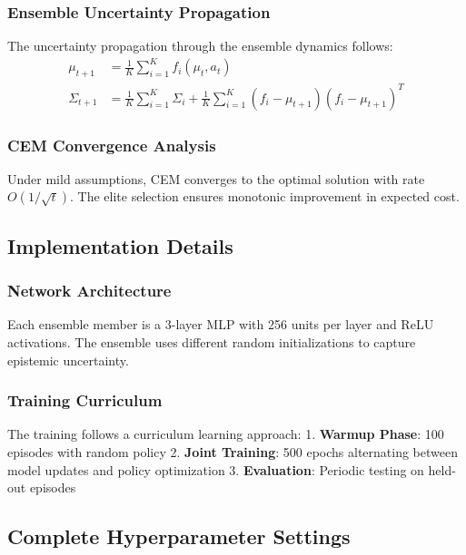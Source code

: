 \documentclass[10pt,twocolumn,letterpaper]{article}
\begin{document}
\subsubsection{Ensemble Uncertainty Propagation}

The uncertainty propagation through the ensemble dynamics follows:
\begin{align}
\mu_{t+1} &= \frac{1}{K} \sum_{i=1}^K f_i(\mu_t, a_t) \\
\Sigma_{t+1} &= \frac{1}{K} \sum_{i=1}^K \Sigma_i + \frac{1}{K} \sum_{i=1}^K (f_i - \mu_{t+1})(f_i - \mu_{t+1})^T
\end{align}

\subsubsection{CEM Convergence Analysis}

Under mild assumptions, CEM converges to the optimal solution with rate $O(1/\sqrt{t})$. The elite selection ensures monotonic improvement in expected cost.

\subsection{Implementation Details}

\subsubsection{Network Architecture}

Each ensemble member is a 3-layer MLP with 256 units per layer and ReLU activations. The ensemble uses different random initializations to capture epistemic uncertainty.

\subsubsection{Training Curriculum}

The training follows a curriculum learning approach:
1. \textbf{Warmup Phase}: 100 episodes with random policy
2. \textbf{Joint Training}: 500 epochs alternating between model updates and policy optimization
3. \textbf{Evaluation}: Periodic testing on held-out episodes

\subsection{Complete Hyperparameter Settings}
\end{document}
